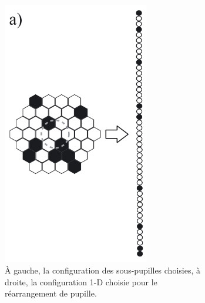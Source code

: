 \begin{figure}[ht!]
    \centering
    \begin{subfigure}[t]{0.45\textwidth}
        \centering
        \includegraphics[width=0.7\textwidth]{Figure_Chap1/Huby2012_Figure2a.png}
        \caption{À gauche, la configuration des sous-pupilles choisies, à droite, la configuration 1-D choisie pour le réarrangement de pupille.}
        \label{fig:FIRSTv1PupilMaskingA}
    \end{subfigure}
    \begin{subfigure}[t]{0.45\textwidth}
        \centering

\end{subfigure}
\end{figure}
